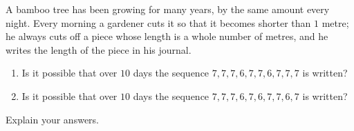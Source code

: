 A bamboo tree has been growing for many years, by the same amount every night. Every morning a gardener cuts it so that it becomes shorter than $1$ metre; he always cuts off a piece whose length is a whole number of metres, and he writes the length of the piece in his journal.
\begin{enumerate}
\item[(a)] Is it possible that over $10$ days the sequence $7,7,7,6,7,7,6,7,7,7$ is written?
\item[(b)] Is it possible that over $10$ days the sequence $7,7,7,6,7,6,7,7,6,7$ is written?
\end{enumerate}
Explain your answers.
